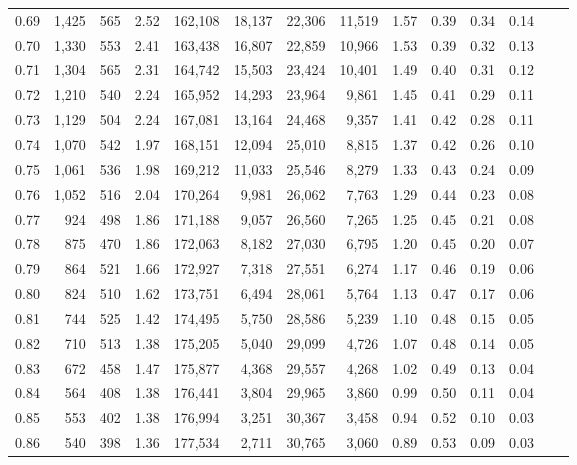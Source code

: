 \begin{tabular}{rrrrrrrrrrrrrr}
0.69 &  1,425 &  565 &    2.52 &  162,108 &   18,137 &  22,306 &  11,519 &  1.57 &  0.39 &  0.34 &      0.14 \\
0.70 &  1,330 &  553 &    2.41 &  163,438 &   16,807 &  22,859 &  10,966 &  1.53 &  0.39 &  0.32 &      0.13 \\
0.71 &  1,304 &  565 &    2.31 &  164,742 &   15,503 &  23,424 &  10,401 &  1.49 &  0.40 &  0.31 &      0.12 \\
0.72 &  1,210 &  540 &    2.24 &  165,952 &   14,293 &  23,964 &   9,861 &  1.45 &  0.41 &  0.29 &      0.11 \\
0.73 &  1,129 &  504 &    2.24 &  167,081 &   13,164 &  24,468 &   9,357 &  1.41 &  0.42 &  0.28 &      0.11 \\
0.74 &  1,070 &  542 &    1.97 &  168,151 &   12,094 &  25,010 &   8,815 &  1.37 &  0.42 &  0.26 &      0.10 \\
0.75 &  1,061 &  536 &    1.98 &  169,212 &   11,033 &  25,546 &   8,279 &  1.33 &  0.43 &  0.24 &      0.09 \\
0.76 &  1,052 &  516 &    2.04 &  170,264 &    9,981 &  26,062 &   7,763 &  1.29 &  0.44 &  0.23 &      0.08 \\
0.77 &    924 &  498 &    1.86 &  171,188 &    9,057 &  26,560 &   7,265 &  1.25 &  0.45 &  0.21 &      0.08 \\
0.78 &    875 &  470 &    1.86 &  172,063 &    8,182 &  27,030 &   6,795 &  1.20 &  0.45 &  0.20 &      0.07 \\
0.79 &    864 &  521 &    1.66 &  172,927 &    7,318 &  27,551 &   6,274 &  1.17 &  0.46 &  0.19 &      0.06 \\
0.80 &    824 &  510 &    1.62 &  173,751 &    6,494 &  28,061 &   5,764 &  1.13 &  0.47 &  0.17 &      0.06 \\
0.81 &    744 &  525 &    1.42 &  174,495 &    5,750 &  28,586 &   5,239 &  1.10 &  0.48 &  0.15 &      0.05 \\
0.82 &    710 &  513 &    1.38 &  175,205 &    5,040 &  29,099 &   4,726 &  1.07 &  0.48 &  0.14 &      0.05 \\
0.83 &    672 &  458 &    1.47 &  175,877 &    4,368 &  29,557 &   4,268 &  1.02 &  0.49 &  0.13 &      0.04 \\
0.84 &    564 &  408 &    1.38 &  176,441 &    3,804 &  29,965 &   3,860 &  0.99 &  0.50 &  0.11 &      0.04 \\
0.85 &    553 &  402 &    1.38 &  176,994 &    3,251 &  30,367 &   3,458 &  0.94 &  0.52 &  0.10 &      0.03 \\
0.86 &    540 &  398 &    1.36 &  177,534 &    2,711 &  30,765 &   3,060 &  0.89 &  0.53 &  0.09 &      0.03 \\

\end{tabular}
